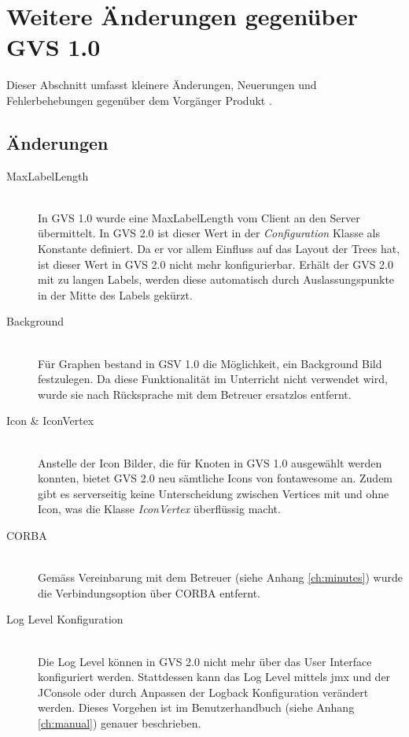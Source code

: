 \documentclass[11pt,a4paper,english,oneside]{book}
\numberwithin{equation}{chapter}
\begin{document}
	\section{Weitere Änderungen gegenüber GVS 1.0}
	Dieser Abschnitt umfasst kleinere Änderungen, Neuerungen und Fehlerbehebungen gegenüber dem Vorgänger Produkt \cite{gvs1}.
	
	\subsection{Änderungen}
	\begin{description}
		\item[MaxLabelLength] \hfill \\
		In GVS 1.0 wurde eine MaxLabelLength vom Client an den Server übermittelt. In GVS 2.0 ist dieser Wert in der \textit{Configuration} Klasse als Konstante definiert. Da er vor allem Einfluss auf das Layout der Trees hat, ist dieser Wert in GVS 2.0 nicht mehr konfigurierbar. Erhält der GVS 2.0 mit zu langen Labels, werden diese automatisch durch Auslassungspunkte in der Mitte des Labels gekürzt.
		\item[Background] \hfill \\ 
		Für Graphen bestand in GSV 1.0 die Möglichkeit, ein Background Bild festzulegen. Da diese Funktionalität im Unterricht nicht verwendet wird, wurde sie nach Rücksprache mit dem Betreuer ersatzlos entfernt.
		\item[Icon \& IconVertex] \hfill \\
		Anstelle der Icon Bilder, die für Knoten in GVS 1.0 ausgewählt werden konnten, bietet GVS 2.0 neu sämtliche Icons von \gls{fontawesome} \cite{fontawesome} an. Zudem gibt es serverseitig keine Unterscheidung zwischen Vertices mit und ohne Icon, was die Klasse \textit{IconVertex} überflüssig macht.
		\item[CORBA] \hfill \\
		Gemäss Vereinbarung mit dem Betreuer (siehe Anhang \ref{ch:minutes}) wurde die Verbindungsoption über CORBA entfernt.
		\item[Log Level Konfiguration] \hfill \\
		Die Log Level können in GVS 2.0 nicht mehr über das User Interface konfiguriert werden. Stattdessen kann das Log Level mittels \gls{jmx} und der JConsole oder durch Anpassen der Logback Konfiguration verändert werden. Dieses Vorgehen ist im Benutzerhandbuch (siehe Anhang \ref{ch:manual}) genauer beschrieben.
	\end{description}
\end{document}
